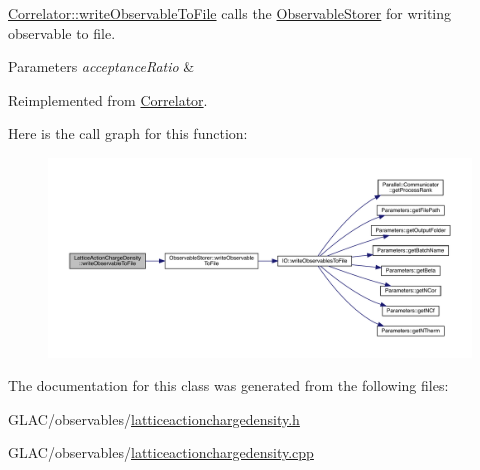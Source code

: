 \mbox{\hyperlink{class_correlator_a9e8d80e30e4fbe3b7fe57521538cb5ff}{Correlator\+::write\+Observable\+To\+File}} calls the \mbox{\hyperlink{class_observable_storer}{Observable\+Storer}} for writing observable to file. 


\begin{DoxyParams}{Parameters}
{\em acceptance\+Ratio} & \\
\hline
\end{DoxyParams}


Reimplemented from \mbox{\hyperlink{class_correlator_a9e8d80e30e4fbe3b7fe57521538cb5ff}{Correlator}}.

Here is the call graph for this function\+:
\nopagebreak
\begin{figure}[H]
\begin{center}
\leavevmode
\includegraphics[width=350pt]{class_lattice_action_charge_density_a719f71aaccbf1b4147ea944781d69908_cgraph}
\end{center}
\end{figure}


The documentation for this class was generated from the following files\+:\begin{DoxyCompactItemize}
\item 
G\+L\+A\+C/observables/\mbox{\hyperlink{latticeactionchargedensity_8h}{latticeactionchargedensity.\+h}}\item 
G\+L\+A\+C/observables/\mbox{\hyperlink{latticeactionchargedensity_8cpp}{latticeactionchargedensity.\+cpp}}\end{DoxyCompactItemize}
